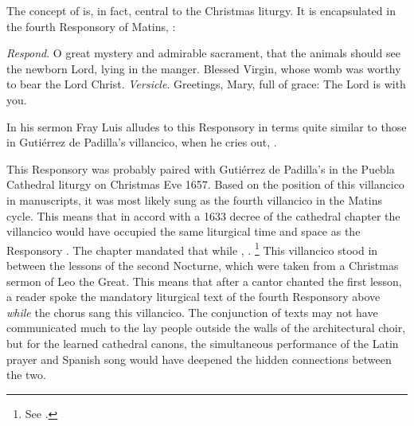 The concept of  is, in fact, central to the Christmas liturgy.
It is encapsulated in the fourth Responsory of Matins, :
\begin{quoting}
    \emph{Respond}. O great mystery and admirable sacrament, that the animals
    should see the newborn Lord, lying in the manger.
    Blessed Virgin, whose womb was worthy to bear the Lord Christ.\newline
    \emph{Versicle}. Greetings, Mary, full of grace: The Lord is with you.%
        \Autocite 
        [175: .]
        {Catholic:Breviarium1631}
\end{quoting}
In his sermon Fray Luis alludes to this Responsory in terms quite similar to
those in Gutiérrez de Padilla's villancico, when he cries out, .%
    \Autocite
    [38: ]
    {LuisdeGranada:Xmas}


This Responsory was probably paired with Gutiérrez de Padilla's  in the Puebla Cathedral liturgy on Christmas Eve 1657.
Based on the position of this villancico in manuscripts, it was most likely
sung as the fourth villancico in the Matins cycle.
This means that in accord with a 1633 decree of the cathedral chapter the
villancico would have occupied the same liturgical time and space as the
Responsory .
The chapter mandated that while , .%
    \footnote{See .}
This villancico stood in between the lessons of the second Nocturne, which were
taken from a Christmas sermon of Leo the Great.
This means that after a cantor chanted the first lesson, a reader spoke the
mandatory liturgical text of the fourth Responsory above \emph{while} the chorus
sang this villancico.
The conjunction of texts may not have communicated much to the lay people
outside the walls of the architectural choir, but for the learned cathedral
canons, the simultaneous performance of the Latin prayer and Spanish song would
have deepened the hidden connections between the two.

